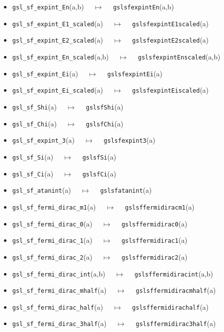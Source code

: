 \documentclass[a4paper,twoside,12pt]{book}
\begin{document}
{\begin{itemize}
\item \texttt{gsl\_sf\_expint\_En}(a,b) $\quad \mapsto\quad $ \texttt{gslsfexpintEn}(a,b) 
\item \texttt{gsl\_sf\_expint\_E1\_scaled}(a) $\quad \mapsto\quad $ \texttt{gslsfexpintE1scaled}(a) 
\item \texttt{gsl\_sf\_expint\_E2\_scaled}(a) $\quad \mapsto\quad $ \texttt{gslsfexpintE2scaled}(a) 
\item \texttt{gsl\_sf\_expint\_En\_scaled}(a,b) $\quad \mapsto\quad $ \texttt{gslsfexpintEnscaled}(a,b) 
\item \texttt{gsl\_sf\_expint\_Ei}(a) $\quad \mapsto\quad $ \texttt{gslsfexpintEi}(a) 
\item \texttt{gsl\_sf\_expint\_Ei\_scaled}(a) $\quad \mapsto\quad $ \texttt{gslsfexpintEiscaled}(a) 
\item \texttt{gsl\_sf\_Shi}(a) $\quad \mapsto\quad $ \texttt{gslsfShi}(a) 
\item \texttt{gsl\_sf\_Chi}(a) $\quad \mapsto\quad $ \texttt{gslsfChi}(a) 
\item \texttt{gsl\_sf\_expint\_3}(a) $\quad \mapsto\quad $ \texttt{gslsfexpint3}(a) 
\item \texttt{gsl\_sf\_Si}(a) $\quad \mapsto\quad $ \texttt{gslsfSi}(a) 
\item \texttt{gsl\_sf\_Ci}(a) $\quad \mapsto\quad $ \texttt{gslsfCi}(a) 
\item \texttt{gsl\_sf\_atanint}(a) $\quad \mapsto\quad $ \texttt{gslsfatanint}(a) 
\item \texttt{gsl\_sf\_fermi\_dirac\_m1}(a) $\quad \mapsto\quad $ \texttt{gslsffermidiracm1}(a) 
\item \texttt{gsl\_sf\_fermi\_dirac\_0}(a) $\quad \mapsto\quad $ \texttt{gslsffermidirac0}(a) 
\item \texttt{gsl\_sf\_fermi\_dirac\_1}(a) $\quad \mapsto\quad $ \texttt{gslsffermidirac1}(a) 
\item \texttt{gsl\_sf\_fermi\_dirac\_2}(a) $\quad \mapsto\quad $ \texttt{gslsffermidirac2}(a) 
\item \texttt{gsl\_sf\_fermi\_dirac\_int}(a,b) $\quad \mapsto\quad $ \texttt{gslsffermidiracint}(a,b) 
\item \texttt{gsl\_sf\_fermi\_dirac\_mhalf}(a) $\quad \mapsto\quad $ \texttt{gslsffermidiracmhalf}(a) 
\item \texttt{gsl\_sf\_fermi\_dirac\_half}(a) $\quad \mapsto\quad $ \texttt{gslsffermidirachalf}(a) 
\item \texttt{gsl\_sf\_fermi\_dirac\_3half}(a) $\quad \mapsto\quad $ \texttt{gslsffermidirac3half}(a) 

\end{itemize}}
\end{document}
